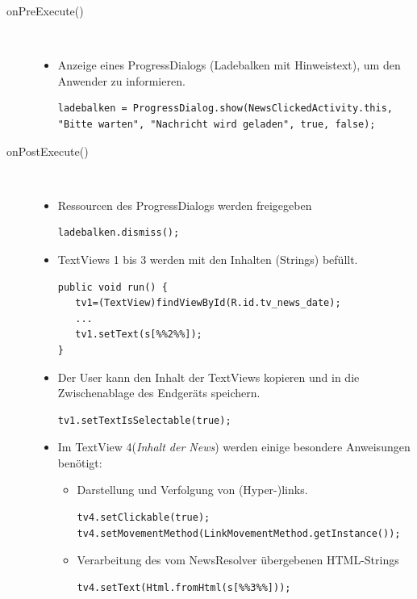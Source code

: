 \begin{description}
\item[onPreExecute()]~\par
\begin{itemize}
\item Anzeige eines ProgressDialogs (Ladebalken mit Hinweistext), um den Anwender zu informieren.
\begin{lstlisting}
ladebalken = ProgressDialog.show(NewsClickedActivity.this, "Bitte warten", "Nachricht wird geladen", true, false);
\end{lstlisting}
\end{itemize}

\item[onPostExecute()]~\par
\begin{itemize}
\item Ressourcen des ProgressDialogs werden freigegeben
\begin{lstlisting}
ladebalken.dismiss();
\end{lstlisting}
\item TextViews 1 bis 3 werden mit den Inhalten (Strings) befüllt.
\begin{lstlisting}
public void run() {
   tv1=(TextView)findViewById(R.id.tv_news_date);
   ...
   tv1.setText(s[%%2%%]);
}
\end{lstlisting}
\item Der User kann den Inhalt der TextViews kopieren und in die Zwischenablage des Endgeräts speichern.
\begin{lstlisting}
tv1.setTextIsSelectable(true);
\end{lstlisting}
\item Im TextView 4(\textit{Inhalt der News}) werden einige besondere Anweisungen benötigt:
\begin{itemize}
\item Darstellung und Verfolgung von (Hyper-)links.
\begin{lstlisting}
tv4.setClickable(true);
tv4.setMovementMethod(LinkMovementMethod.getInstance());
\end{lstlisting}
\item Verarbeitung des vom NewsResolver übergebenen HTML-Strings
\begin{lstlisting}
tv4.setText(Html.fromHtml(s[%%3%%]));
\end{lstlisting}
\end{itemize}
\end{itemize}


\end{description}
